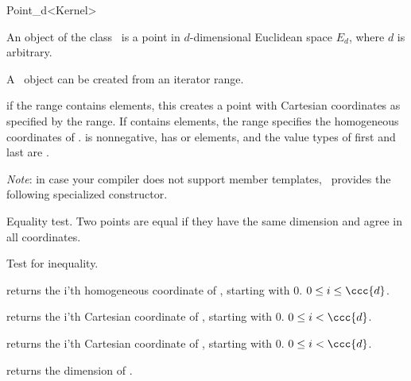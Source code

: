 \begin{ccRefClass}{Point_d<Kernel>}

\ccDefinition

An object of the class \ccClassTemplateName\ is a point in $d$-dimensional
Euclidean space $E_d$, where $d$ is arbitrary. 


\ccCreation
{}

A \ccClassTemplateName\ object can be created from an iterator range. 

	{if the range \ccc{[first,last)} contains  elements,
	 this creates a point with Cartesian coordinates as specified by 
	 the range. If \ccc{[first,last)} contains  elements,
	 the range specifies the homogeneous coordinates of \ccVar. 
	 \ccPrecond {} is nonnegative, \ccc{[first,last)} has 
	  or  elements, and the value types of first
	 and last are .}

\emph{Note}: in case your compiler does not support member templates, \cgal\
provides the following specialized constructor.


\ccOperations

	{Equality test. Two points are equal if they have the same
	 dimension and agree in all coordinates.}

	{Test for inequality.}

	{returns the i'th homogeneous coordinate of \ccVar, starting
	 with 0. \ccPrecond $0\leq i\leq \ccc{d}$.}

	{returns the i'th Cartesian coordinate of \ccVar, starting
	 with 0. \ccPrecond $0\leq i < \ccc{d}$.}

	{returns the i'th Cartesian coordinate of \ccVar, starting
	with 0. \ccPrecond $0\leq i < $.}

	{returns the dimension \ccc{d} of \ccVar.}

\ccSeeAlso
{}

\end{ccRefClass}%
